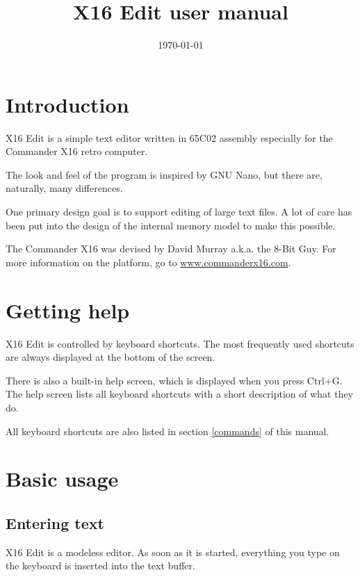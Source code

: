 \documentclass{article}
\title{X16 Edit user manual}
\date{\today}
\begin{document}
\maketitle

\section{Introduction}

    X16 Edit is a simple text editor written in 65C02 assembly especially
    for the Commander X16 retro computer. 
    
    The look and feel of the program is inspired by GNU Nano, but there are,
    naturally, many differences.
    
    One primary design goal is to support editing of large text 
    files. A lot of care has been put into the design of
    the internal memory model to make this possible.

    The Commander X16 was devised by David Murray a.k.a. the 
    8-Bit Guy. For more information on the platform, go to 
    \href{http://www.commanderx16.com}{www.commanderx16.com}.

\section{Getting help}

    X16 Edit is controlled by keyboard shortcuts. The most frequently used 
    shortcuts are always displayed at the bottom of the screen.
    
    There is also a built-in help screen, which is displayed when you press
    Ctrl+G. The help screen lists all keyboard shortcuts with a short description
    of what they do.

    All keyboard shortcuts are also listed in section \ref{commands} of this manual.

\section{Basic usage}

    \subsection{Entering text}
           
        X16 Edit is a modeless editor. As soon as it is started, everything you
        type on the keyboard is inserted into the text buffer.
        
\end{document}
